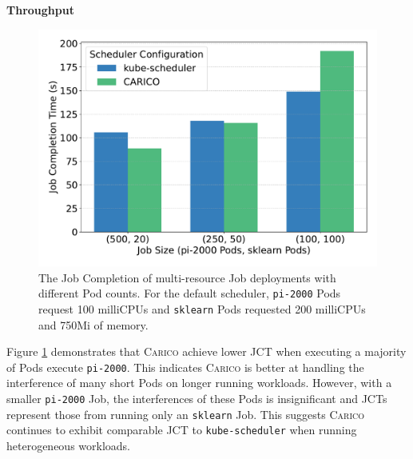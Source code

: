 \textbf{Throughput}\\
\begin{figure}[ht!]
    \centering
    \includegraphics[width=\textwidth]{images/mixed-job-completion.pdf}
    \caption{The Job Completion of multi-resource Job deployments with different Pod
    counts. For the default scheduler, \texttt{pi-2000} Pods request 100
    milliCPUs and \texttt{sklearn} Pods requested 200 milliCPUs and 750Mi of
    memory.}
    \label{fig:mixed-throughput}
\end{figure}

Figure \ref{fig:mixed-throughput} demonstrates that \textsc{Carico} achieve
lower JCT when executing a majority of Pods execute \texttt{pi-2000}.
This indicates \textsc{Carico} is better at handling the interference of many
short Pods on longer running workloads. However, with a smaller \texttt{pi-2000}
Job, the interferences of these Pods is insignificant and JCTs represent those
from running only an \texttt{sklearn} Job. This suggests \textsc{Carico}
continues to exhibit comparable JCT to \texttt{kube-scheduler} when running
heterogeneous workloads.

